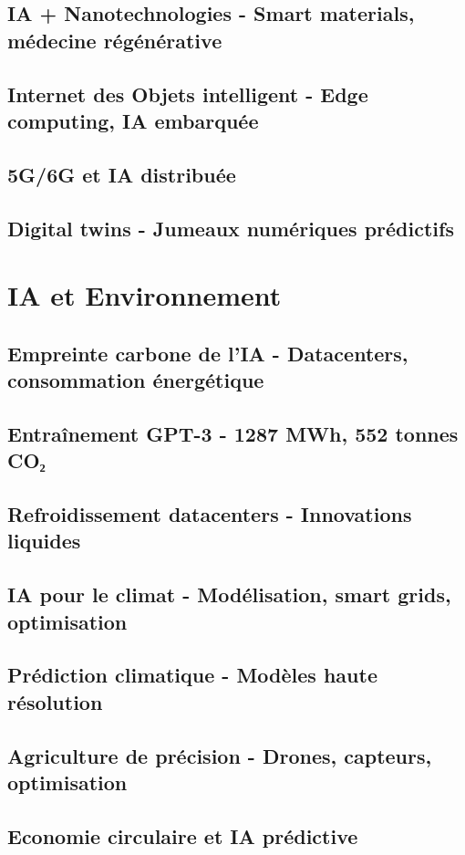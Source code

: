 \documentclass[12pt,a4paper]{book}
\begin{document}
\section{IA + Nanotechnologies - Smart materials, médecine régénérative}
\section{Internet des Objets intelligent - Edge computing, IA embarquée}
\section{5G/6G et IA distribuée}
\section{Digital twins - Jumeaux numériques prédictifs}

\chapter{IA et Environnement}
\section{Empreinte carbone de l'IA - Datacenters, consommation énergétique}
\section{Entraînement GPT-3 - 1287 MWh, 552 tonnes CO₂}
\section{Refroidissement datacenters - Innovations liquides}
\section{IA pour le climat - Modélisation, smart grids, optimisation}
\section{Prédiction climatique - Modèles haute résolution}
\section{Agriculture de précision - Drones, capteurs, optimisation}
\section{Economie circulaire et IA prédictive}
\end{document}
